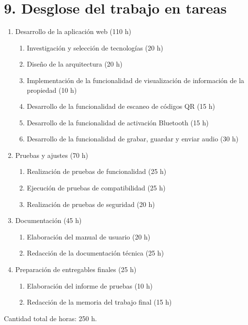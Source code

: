 \documentclass[
11pt, %
codirector, %
]{charter}
\begin{document}
\section{9. Desglose del trabajo en tareas}
\label{sec:wbs}
\begin{enumerate}
\item Desarrollo de la aplicación web (110 h)
    \begin{enumerate}
        \item Investigación y selección de tecnologías (20 h)
        \item Diseño de la arquitectura (20 h)
        \item Implementación de la funcionalidad de visualización de información de la propiedad (10 h)
        \item Desarrollo de la funcionalidad de escaneo de códigos QR (15 h)
        \item Desarrollo de la funcionalidad de activación Bluetooth (15 h)
        \item Desarrollo de la funcionalidad de grabar, guardar y enviar audio (30 h)
    \end{enumerate}
\item Pruebas y ajustes (70 h)
    \begin{enumerate}
        \item Realización de pruebas de funcionalidad (25 h)
        \item Ejecución de pruebas de compatibilidad (25 h)
        \item Realización de pruebas de seguridad (20 h)
    \end{enumerate}
\item Documentación (45 h)
    \begin{enumerate}
        \item Elaboración del manual de usuario (20 h)
        \item Redacción de la documentación técnica (25 h)
    \end{enumerate}
\item Preparación de entregables finales (25 h)
        \begin{enumerate}
            \item Elaboración del informe de pruebas (10 h)
            \item Redacción de la memoria del trabajo final (15 h)
        \end{enumerate}
    \end{enumerate}

Cantidad total de horas: 250 h.
\end{document}
